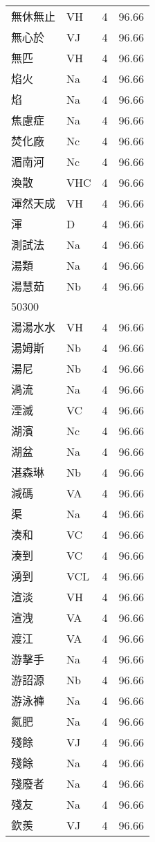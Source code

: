 \documentclass[twocolumn]{book}
\begin{document}
\begin{supertabular}{llrr}
無休無止 & VH & 4 &  96.66\\
無心於 & VJ & 4 &  96.66\\
無匹 & VH & 4 &  96.66\\
焰火 & Na & 4 &  96.66\\
焰 & Na & 4 &  96.66\\
焦慮症 & Na & 4 &  96.66\\
焚化廠 & Nc & 4 &  96.66\\
湄南河 & Nc & 4 &  96.66\\
渙散 & VHC & 4 &  96.66\\
渾然天成 & VH & 4 &  96.66\\
渾 & D & 4 &  96.66\\
測試法 & Na & 4 &  96.66\\
湯類 & Na & 4 &  96.66\\
湯慧茹 & Nb & 4 &  96.66\\
50300\\
湯湯水水 & VH & 4 &  96.66\\
湯姆斯 & Nb & 4 &  96.66\\
湯尼 & Nb & 4 &  96.66\\
渦流 & Na & 4 &  96.66\\
湮滅 & VC & 4 &  96.66\\
湖濱 & Nc & 4 &  96.66\\
湖盆 & Na & 4 &  96.66\\
湛森琳 & Nb & 4 &  96.66\\
減碼 & VA & 4 &  96.66\\
渠 & Na & 4 &  96.66\\
湊和 & VC & 4 &  96.66\\
湊到 & VC & 4 &  96.66\\
湧到 & VCL & 4 &  96.66\\
渲淡 & VH & 4 &  96.66\\
渲洩 & VA & 4 &  96.66\\
渡江 & VA & 4 &  96.66\\
游擊手 & Na & 4 &  96.66\\
游詔源 & Nb & 4 &  96.66\\
游泳褲 & Na & 4 &  96.66\\
氮肥 & Na & 4 &  96.66\\
殘餘 & VJ & 4 &  96.66\\
殘餘 & Na & 4 &  96.66\\
殘廢者 & Na & 4 &  96.66\\
殘友 & Na & 4 &  96.66\\
欽羨 & VJ & 4 &  96.66\\

\end{supertabular}
\end{document}
